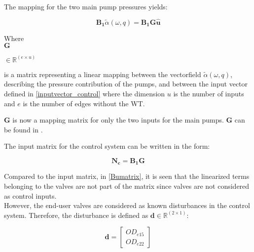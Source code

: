 The mapping for the two main pump pressures yields:

\begin{equation}
\bm{B_1} \tilde{\alpha}(\omega,q) = \bm{B_1} \bm{G} \bm{\hat{u}}
\label{mapping_main}
\end{equation}

\begin{minipage}[t]{0.12\textwidth}
Where\\
\hspace*{8mm} $\bm{G}$ 
\end{minipage}
\begin{minipage}[t]{0.12\textwidth}
\vspace*{2mm}$\in \bm{\mathbb{R}}^{(e \times u)} $ 
\end{minipage}
\begin{minipage}[t]{0.74\textwidth}
\vspace*{2mm}
is a matrix representing a linear mapping between the vectorfield $\tilde\alpha(\omega,q)$, describing the pressure contribution of the pumps, and between the input vector defined in \eqref{inputvector_control} where the dimension $u$ is the number of inputs and $e$ is the number of edges without the WT. 
\end{minipage} 

$\bm{G}$ is now a mapping matrix for only the two inputs for the main pumps. $\bm{G}$ can be found in .

The input matrix for the control system can be written in the form: 

\begin{equation}
  \bm{N_c} =  \bm{B_1}\bm{G}  
\label{inputmatrix_control}	
\end{equation}

Compared to the input matrix, in \eqref{Bumatrix}, it is seen that the linearized terms belonging to the valves are not part of the matrix since valves are not considered as control inputs. 
\\
However, the end-user valves are considered as known disturbances in the control system. Therefore, the disturbance is defined as $\bm{d} \in \bm{\mathbb{R}}^{(2 \times 1)}$: 

\begin{equation}
\bm{d} =
\begin{bmatrix} 
OD_{e15} \\
OD_{e22} 
\label{disturbancevector_control}
\end{bmatrix} 
\end{equation}

